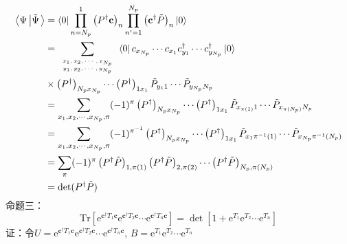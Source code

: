 \documentclass[UTF8,cs4size]{ctexart}
\def\ee{\mathrm e}
\begin{document}
\[
    \begin{aligned}
        \left< \Psi \left| \tilde{\Psi} \right. \right>
        &=\left< 0 \right| \prod_{n=N_p}^{1} \left( P^{\dag} \mathbf{c} \right)_n
            \prod_{n'=1}^{N_p} \left( \mathbf{c^{\dag}} \tilde{P}\right)_{n} \left|0\right>\\
        &=\sum_{\mbox{\tiny$\begin{array}{c}
            x_1,x_2,\cdots,x_{N_p}\\
            y_1,y_2,\cdots,y_{N_p}
           \end{array}$}}
        \left< 0 \right| c_{x_{N_p}} \cdots c_{x_1} c^{\dag}_{y_1} \cdots c^{\dag}_{y_{N_p}} \left| 0 \right>\\
        &\times  \left(P^{\dag}\right)_{N_p x_{N_p}} \cdots \left(P^{\dag}\right)_{1 x_{1}}
        \tilde{P}_{y_1 1} \cdots \tilde{P}_{y_{N_p} N_p}\\
        &=\sum_{x_1,x_2,\cdots,x_{N_p},\pi}(-1)^{\pi} 
        \left(P^{\dag}\right)_{N_p x_{N_p}} \cdots \left(P^{\dag}\right)_{1 x_{1}}
        \tilde{P}_{x_{\pi(1)} 1} \cdots \tilde{P}_{x_{\pi(N_p)} N_p}\\
        &=\sum_{x_1,x_2,\cdots,x_{N_p},\pi}(-1)^{\pi^{-1}} 
        \left(P^{\dag}\right)_{N_p x_{N_p}} \cdots \left(P^{\dag}\right)_{1 x_{1}}
        \tilde{P}_{x_1 \pi^{-1}(1)} \cdots \tilde{P}_{x_{N_p} \pi^{-1}(N_p)}\\
        &=\sum_{\pi} (-1)^\pi \left( P^{\dag} \tilde{P}\right)_{1,\pi(1)} 
        \left( P^{\dag} \tilde{P}\right)_{2,\pi(2)}   \cdots
        \left( P^{\dag} \tilde{P}\right)_{N_p,\pi(N_p)} \\
        &=\det(P^{\dag} \tilde{P})
    \end{aligned}    
\]
命题三：
\[
    \mathrm{Tr} \left[ \ee^{\mathbf{c^{\dag}} T_1 \mathbf{c}} 
    \ee^{\mathbf{c^{\dag}} T_2 \mathbf{c}} \cdots \ee^{\mathbf{c^{\dag}} T_n \mathbf{c}} \right]
    = \det \left[ 1+ \ee^{T_1} \ee^{T_2} \cdots \ee^{T_n}\right] 
\]
证：令$U=\ee^{\mathbf{c^{\dag}} T_1 \mathbf{c}} 
\ee^{\mathbf{c^{\dag}} T_2 \mathbf{c}} \cdots \ee^{\mathbf{c^{\dag}} T_n \mathbf{c}}$,
$B=\ee^{T_1} \ee^{T_2} \cdots \ee^{T_n}$
\end{document}
